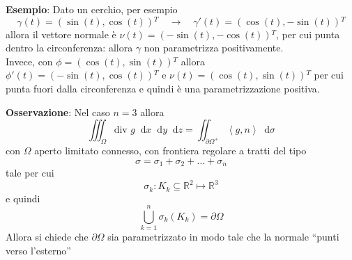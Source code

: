 \documentclass[a4paper]{extarticle}
\newcommand{\quotes}[1]{``#1''}
\newcommand*\dif{\mathop{}\!\mathrm{d}}
\begin{document}
\vspace{1em}
\noindent
\textbf{Esempio}: Dato un cerchio, per esempio
\[\gamma(t) = \left(\sin(t),\cos(t)\right){^T} \hspace{1em} \rightarrow \hspace{1em} \gamma'(t) = (\cos(t),-\sin(t)){^T}\]
allora il vettore normale è $\nu(t)=\left(-\sin(t),-\cos(t)\right){^T}$, per cui punta dentro la circonferenza: allora $\gamma$ non parametrizza positivamente.\\
Invece, con $\phi=(\cos(t),\sin(t)){^T}$ allora $\phi'(t)=(-\sin(t),\cos(t)){^T}$ e $\nu(t)=(\cos(t),\sin(t)){^T}$ per cui punta fuori dalla circonferenza e quindi è una parametrizzazione positiva.

\vspace{2em}
\noindent
\textbf{Osservazione}: Nel caso $n=3$ allora
\[\iiint_{\Omega} \text{div } g \dif x \dif y \dif z = \iint_{\partial \Omega^+} \left<g,n\right> \dif \sigma\]
con $\Omega$ aperto limitato connesso, con frontiera regolare a tratti del tipo
\[\sigma = \sigma_1 + \sigma_2 + \dots + \sigma_n\]
tale per cui
\[\sigma_k : K_k \subseteq \mathbb{R}^2 \longmapsto \mathbb{R}^3\]
e quindi
\[\bigcup_{k=1}^n \sigma_k(K_k) = \partial \Omega\]
Allora si chiede che $\partial \Omega$ sia parametrizzato in modo tale che la normale \quotes{punti verso l'esterno}
\end{document}
